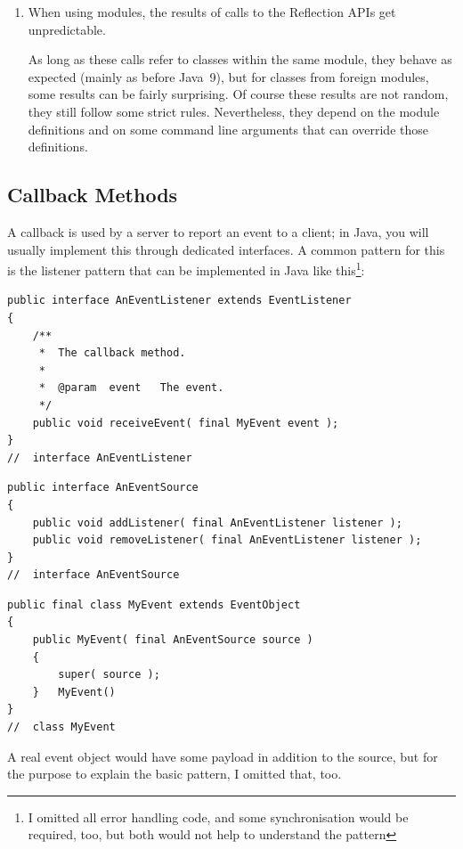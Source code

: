 \documentclass[11pt,a4paper, titlepage, parskip=half, headsepline, footsepline, cleardoublepage=current, headheight=1cm]{scrbook}
\begin{document}
\begin{enumerate}[label=P\arabic*.]
\item{When using modules\autocite{OPENJDK:ProjectJigsaw}, the results of calls to the Reflection APIs get unpredictable.

As long as these calls refer to classes within the same module, they behave as expected (mainly as before Java~9), but for classes from foreign modules, some results can be fairly surprising. Of course these results are not random, they still follow some strict rules. Nevertheless, they depend on the module definitions and on some command line arguments that can override those definitions.}
\end{enumerate}


\subsection{Callback Methods}
A callback is used by a server to report an event to a client; in Java, you will usually implement this through dedicated interfaces. A common pattern for this is the listener pattern that can be implemented in Java like this\footnote{I omitted all error handling code, and some synchronisation would be required, too, but both would not help to understand the pattern}:
\begin{lstlisting}
public interface AnEventListener extends EventListener
{
    /**
     *  The callback method.
     *
     *  @param  event   The event.
     */
    public void receiveEvent( final MyEvent event );
}
//  interface AnEventListener
\end{lstlisting}

\begin{lstlisting}
public interface AnEventSource
{
    public void addListener( final AnEventListener listener );
    public void removeListener( final AnEventListener listener );
}
//  interface AnEventSource
\end{lstlisting}

\begin{lstlisting}
public final class MyEvent extends EventObject
{
    public MyEvent( final AnEventSource source )
    {
        super( source );
    }   MyEvent()
}
//  class MyEvent
\end{lstlisting}
A real event object would have some payload in addition to the source, but for the purpose to explain the basic pattern, I omitted that, too.
\end{document}
